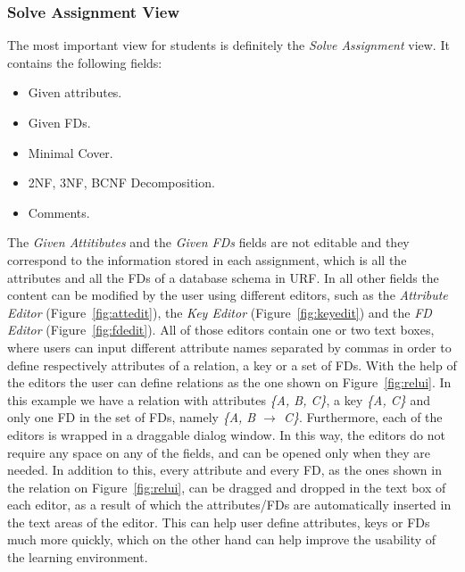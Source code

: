 \subsubsection{Solve Assignment View}
The most important view for students is definitely the \textit{Solve Assignment} view.
It contains the following fields:

\begin{itemize}
	\item Given attributes.
	\item Given FDs.
	\item Minimal Cover.
	\item 2NF, 3NF, BCNF Decomposition.
	\item Comments.
\end{itemize}

The \textit{Given Attitibutes} and the \textit{Given FDs} fields are not editable
and they correspond	to the information stored in each assignment, which is all the 
attributes and all the FDs of a database schema in URF. In all other fields 
the content can be modified by the user using different editors,
such as the \textit{Attribute Editor} (Figure~\ref{fig:attedit}), 
the \textit{Key Editor} (Figure~\ref{fig:keyedit}) and the \textit{FD Editor}
(Figure~\ref{fig:fdedit}).
All of those editors contain one or two text boxes, where users can input 
different attribute names separated by commas
in order to define respectively attributes of a relation, a key or a set of FDs. With
the help of the editors the user can define relations as the one shown on 
Figure~\ref{fig:relui}. In this example we have a relation with attributes 
\textit{\{A, B, C\}}, a key \textit{\{A, C\}} and only one FD in the set of FDs,
namely \textit{\{A, B $\rightarrow$ C\}}.  Furthermore,
each of the editors is wrapped in a draggable dialog window. 
In this way, the editors do not require any space on any of the fields, 
and can be opened only when they are needed. In addition to this, every attribute and every FD,
as the ones shown in the relation on Figure~\ref{fig:relui}, can be dragged and
dropped in the text box of each editor, as a result of which the attributes/FDs
are automatically inserted in the text areas of the editor.
This can help user define attributes, keys or
FDs much more quickly, which on the other hand can help improve the usability of 
the learning environment. 

